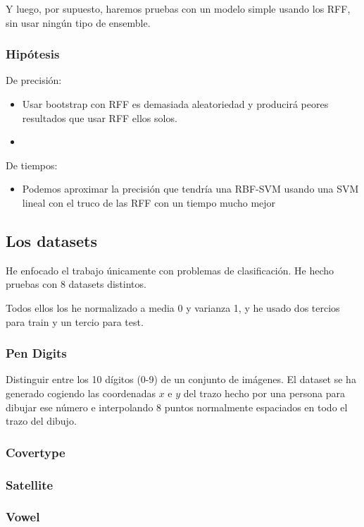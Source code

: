 \documentclass{article}
\begin{document}
Y luego, por supuesto, haremos pruebas con un modelo simple usando los RFF, sin
usar ningún tipo de ensemble.

\subsubsection{Hipótesis}
De precisión:
\begin{itemize}
  \item Usar bootstrap con RFF es demasiada aleatoriedad y producirá peores
  resultados que usar RFF ellos solos.
  \item
\end{itemize}

De tiempos:
\begin{itemize}
  \item Podemos aproximar la precisión que tendría una RBF-SVM usando una SVM
  lineal con el truco de las RFF con un tiempo mucho mejor
\end{itemize}

\subsection{Los datasets}
He enfocado el trabajo únicamente con problemas de clasificación. He hecho
pruebas con 8 datasets distintos.

Todos ellos los he normalizado a media 0 y varianza 1, y he usado dos tercios
para train y un tercio para test.

\subsubsection{Pen Digits}
\cite[Vease][]{pen_digits}
Distinguir entre los 10 dígitos (0-9) de un conjunto de imágenes. El dataset
se ha generado cogiendo las coordenadas $x$ e $y$ del trazo hecho por una
persona para dibujar ese número e interpolando 8 puntos normalmente espaciados
en todo el trazo del dibujo.


\subsubsection{Covertype}
\subsubsection{Satellite}
\subsubsection{Vowel}
\end{document}
